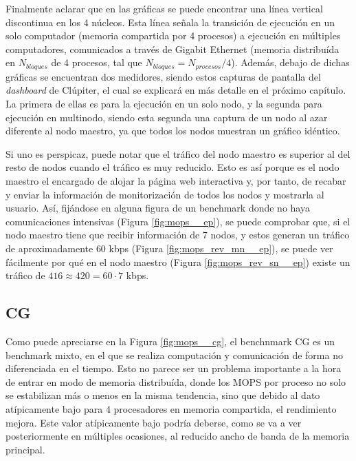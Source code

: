 Finalmente aclarar que en las gráficas se puede encontrar una línea vertical discontinua en los 4 núcleos. Esta línea señala la transición de ejecución en un solo computador (memoria compartida por 4 procesos) a ejecución en múltiples computadores, comunicados a través de Gigabit Ethernet (memoria distribuída en $N_{bloques}$ de 4 procesos, tal que $N_{bloques} = N_{procesos} / 4$). Además, debajo de dichas gráficas se encuentran dos medidores, siendo estos capturas de pantalla del \textit{dashboard} de Clúpiter, el cual se explicará en más detalle en el próximo capítulo. La primera de ellas es para la ejecución en un solo nodo, y la segunda para ejecución en multinodo, siendo esta segunda una captura de un nodo al azar diferente al nodo maestro, ya que todos los nodos muestran un gráfico idéntico.

Si uno es perspicaz, puede notar que el tráfico del nodo maestro es superior al del resto de nodos cuando el tráfico es muy reducido. Esto es así porque es el nodo maestro el encargado de alojar la página web interactiva y, por tanto, de recabar y enviar la información de monitorización de todos los nodos y mostrarla al usuario. Así, fijándose en alguna figura de un benchmark donde no haya comunicaciones intensivas (Figura \ref{fig:mops__ep}), se puede comprobar que, si el nodo maestro tiene que recibir información de 7 nodos, y estos generan un tráfico de aproximadamente $60$ kbps (Figura \ref{fig:mops_rev_mn__ep}), se puede ver fácilmente por qué en el nodo maestro (Figura \ref{fig:mops_rev_sn__ep}) existe un tráfico de $416 \approx 420 = 60 \cdot 7$ kbps.

\subsection{CG}
\label{ssec:comparacion_resultados__cg}

Como puede apreciarse en la Figura \ref{fig:mops__cg}, el benchnmark CG es un benchmark mixto, en el que se realiza computación y comunicación de forma no diferenciada en el tiempo. Esto no parece ser un problema importante a la hora de entrar en modo de memoria distribuída, donde los MOPS por proceso no solo se estabilizan más o menos en la misma tendencia, sino que debido al dato atípicamente bajo para 4 procesadores en memoria compartida, el rendimiento mejora. Este valor atípicamente bajo podría deberse, como se va a ver posteriormente en múltiples ocasiones, al reducido ancho de banda de la memoria principal.

